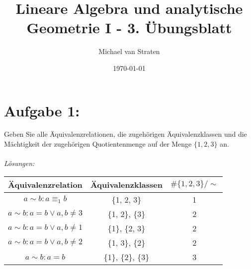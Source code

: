 \documentclass{exam}
\title{Lineare Algebra und analytische Geometrie I - 3. Übungsblatt}
\author{Michael van Straten}
\date{\today}
\begin{document}
\maketitle

\section*{Aufgabe 1:}
Geben Sie alle Äquivalenzrelationen, die zugehörigen Äquivalenzklassen und die Mächtigkeit der
zugehörigen Quotientenmenge auf der Menge $\{1, 2, 3\}$ an. \\
\\
\textit{Lösungen:}
\begin{center}
	\begin{tabular}{ | c | c | c | }
		\hline
		\textbf{Äquivalenzrelation}         & \textbf{Äquivalenzklassen} & $\#\{1,2,3\}/\sim$ \\
		\hline
		$a \sim b: a \equiv_1 b$            & \{1, 2, 3\}                & 1                  \\
		$a \sim b: a = b \lor a,b \not = 3$ & \{1, 2\}, \{3\}            & 2                  \\
		$a \sim b: a = b \lor a,b \not = 1$ & \{1\}, \{2, 3\}            & 2                  \\
		$a \sim b: a = b \lor a,b \not = 2$ & \{1, 3\}, \{2\}            & 2                  \\
		$a \sim b: a = b$                   & \{1\}, \{2\}, \{3\}        & 3                  \\
		\hline
	\end{tabular}
\end{center}

\pagebreak
\end{document}
